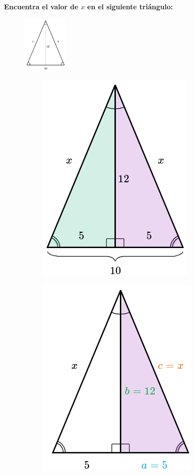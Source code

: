 \textbf{Encuentra el valor de $x$ en el siguiente triángulo:}

\begin{figure}[H]
    \centering
    \includegraphics[width=0.2\textwidth]{../images/pitagoras11.png}
\end{figure}

\begin{solutionbox}{15cm}
    \begin{figure}[H]
        \centering
        \captionsetup[figure]{size=footnotesize,justification=centering}
        \captionsetup[subfigure]{justification=centering}
        \begin{subfigure}{0.25\linewidth}
            \includegraphics[width=0.5\linewidth]{../images/pitagoras11a.png}
            \caption{}
            \label{subfig:pitagoras11a}
        \end{subfigure}
        \begin{subfigure}{0.25\linewidth}
            \includegraphics[width=0.5\linewidth]{../images/pitagoras11b.png}
            \caption{}
            \label{subfig:pitagoras11b}
        \end{subfigure}
        \caption{}
        \label{fig:pitagoras11}
    \end{figure}


\end{solutionbox}
